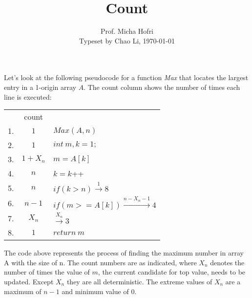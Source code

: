 \documentclass{article}
\title{Count}
\author{Prof. Micha Hofri\\Typeset by Chao Li, \today}
\begin{document}
\maketitle
Let's look at the following pseudocode for a function {\sl Max} that
locates the largest entry in a 1-origin array $A$. The count column
shows the number of times each line is executed:\\
\begin{center}
\begin{tabular}{c c l}  %
     & count          & \\
1.   & $1$              & $Max(A,n)$ \\
2.   & $1$              & $int\ m, k = 1;$ \\
3.   & $1+X_n$        & $m = A[k]$ \\
4.   & $n$            & $k = k$++ \\
5.   & $n$            & $if(k > n) \overset{1}{\longrightarrow} 8$ \\
6.   & $n-1$          & $if(m>=A[k]) \overset{n-X_n-1}{\longrightarrow} 4$ \\
7.   & $X_n$          & $\overset{X_n}{\longrightarrow} 3$ \\
8.   & $1$              & $return\ m$ \\
\end{tabular}
\end{center}
The code above represents the process of finding the maximum number in
array A with the size of n.
The count numbers are as indicated, where $X_n$ denotes the number of
times the value of $m$, the current candidate for top value, needs to be
updated. Except $X_n$ they are all deterministic.
The extreme values of $X_n$ are a maximum of $n-1$ and
minimum value of $0$.\\

\end{document}
